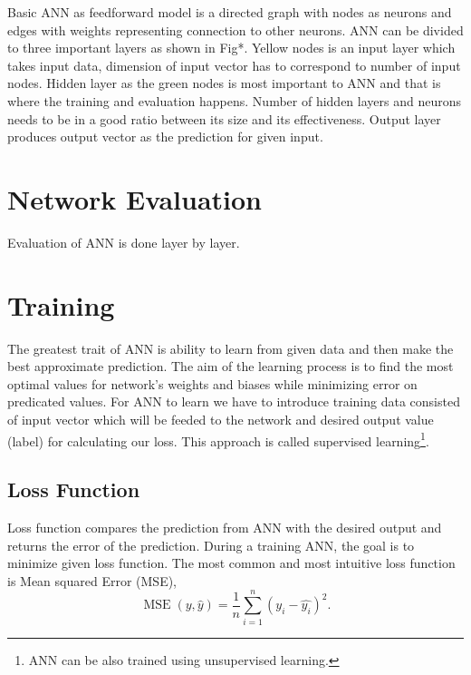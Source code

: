 
Basic ANN as feedforward model is a directed graph with nodes as neurons and edges with weights representing connection to other neurons.
ANN can be divided to three important layers as shown in Fig*.
Yellow nodes is an input layer which takes input data, dimension of input vector has to correspond to number of input nodes.
Hidden layer as the green nodes is most important to ANN and that is where the training and evaluation happens.
Number of hidden layers and neurons needs to be in a good ratio between its size and its effectiveness.
Output layer produces output vector as the prediction for given input.


\section{Network Evaluation}

Evaluation of ANN is done layer by layer.


\section{Training}

The greatest trait of ANN is ability to learn from given data and then make the best approximate prediction.
The aim of the learning process is to find the most optimal values for network's weights and biases while minimizing error on predicated values.
For ANN to learn we have to introduce training data consisted of input vector which will be feeded to the network and desired output value (label) for calculating our loss.
This approach is called supervised learning\footnote{\label{note1}ANN can be also trained using unsupervised learning.}.
\newline

\subsection{Loss Function}

Loss function compares the prediction from ANN with the desired output and returns the error of the prediction.
During a training ANN, the goal is to minimize given loss function.
The most common and most intuitive loss function is Mean squared Error (MSE),
\[ \operatorname{MSE}(y, \hat{y}) = \frac{1}{n}\sum_{i=1}^n(y_i-\hat{y_i})^2. \]


